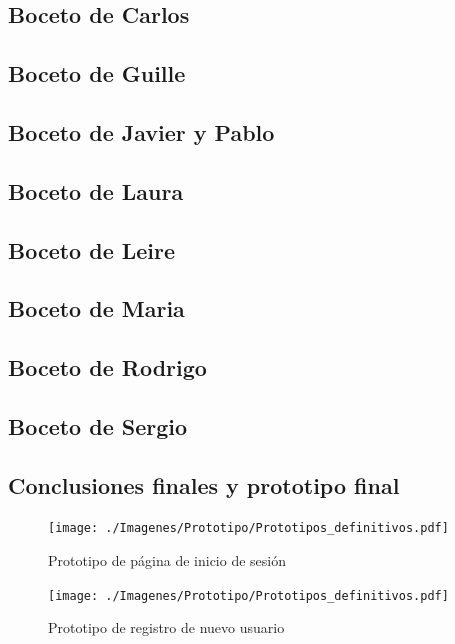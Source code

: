 \subsection{Boceto de Carlos}

\subsection{Boceto de Guille}

\subsection{Boceto de Javier y Pablo}

\subsection{Boceto de Laura}

\subsection{Boceto de Leire}

\subsection{Boceto de Maria}

\subsection{Boceto de Rodrigo}

\subsection{Boceto de Sergio}


\subsection{Conclusiones finales y prototipo final}


\begin{figure}[H]
    \centering
    \texttt{[image: ./Imagenes/Prototipo/Prototipos\_definitivos.pdf]}
    \label{fig:prot_ses}
    \caption{Prototipo de página de inicio de sesión}
\end{figure}

\begin{figure}[H]
    \centering
    \texttt{[image: ./Imagenes/Prototipo/Prototipos\_definitivos.pdf]}
    \label{fig:prot_reg}
    \caption{Prototipo de registro de nuevo usuario}
\end{figure}

